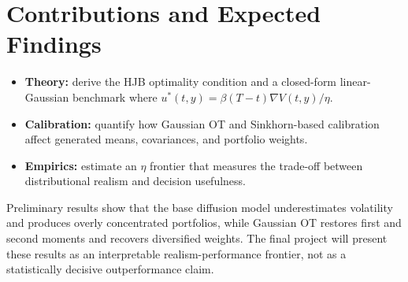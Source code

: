 \documentclass[10pt]{article}
\begin{document}
\section*{Contributions and Expected Findings}
\begin{itemize}
\item \textbf{Theory:} derive the HJB optimality condition and a closed-form linear-Gaussian benchmark where $u^*(t,y)=\beta(T-t)\nabla V(t,y)/\eta$.
\item \textbf{Calibration:} quantify how Gaussian OT and Sinkhorn-based calibration affect generated means, covariances, and portfolio weights.
\item \textbf{Empirics:} estimate an $\eta$ frontier that measures the trade-off between distributional realism and decision usefulness.
\end{itemize}
Preliminary results show that the base diffusion model underestimates volatility and produces overly concentrated portfolios, while Gaussian OT restores first and second moments and recovers diversified weights. The final project will present these results as an interpretable realism-performance frontier, not as a statistically decisive outperformance claim.
\end{document}
